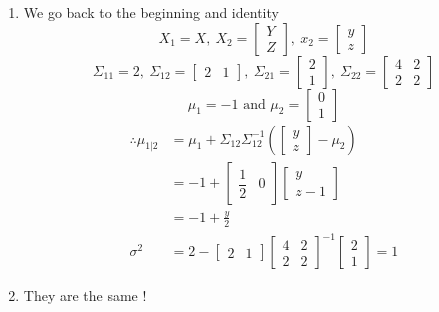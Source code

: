 \documentclass[letterpaper]{article}
\begin{document}
\begin{enumerate}
\item We go back to the beginning and identity
$$X_1=X,~X_2=\left[\begin{array}{c} Y \\Z\end{array} \right],~x_2=\left[\begin{array}{c} y \\z\end{array} \right]$$
$$\Sigma_{11}=2,~\Sigma_{12}=\left[\begin{array}{rr} 2 & 1\end{array} \right],~\Sigma_{21}=\left[\begin{array}{r} 2 \\ 1\end{array} \right],~\Sigma_{22}=\left[\begin{array}{rr} 4 & 2\\ 2& 2\end{array} \right]$$
$$\mu_{1}=-1 \text{~and~}\mu_{2}=\left[\begin{array}{r} 0 \\ 1\end{array} \right]$$
$$\begin{aligned}
\therefore \mu_{1|2}&=\mu_1+\Sigma_{12}\Sigma^{-1}_{12}\left(\left[\begin{array}{c} y \\z\end{array} \right]-\mu_2\right) \\[2ex]
&= -1+\left[\begin{array}{cc} \dfrac{1}{2} & 0\end{array} \right]\left[\begin{array}{c} y \\ z-1\end{array} \right]\\[2ex]
&=-1+\frac{y}{2} \\
\sigma^2&=2-\left[\begin{array}{cc} 2 & 1\end{array} \right]\left[\begin{array}{cc} 4 & 2\\ 2 & 2\end{array} \right]^{-1}\left[\begin{array}{cc} 2 \\ 1\end{array} \right]=1
\end{aligned}$$
\item They are the same !
\end{enumerate}
\bigskip
\end{document}
